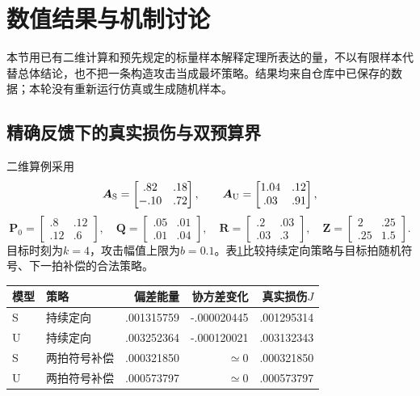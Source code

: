 \section{数值结果与机制讨论}
本节用已有二维计算和预先规定的标量样本解释定理所表达的量，不以有限样本代替总体结论，也不把一条构造攻击当成最坏策略。结果均来自仓库中已保存的数据；本轮没有重新运行仿真或生成随机样本。

\subsection{精确反馈下的真实损伤与双预算界}
二维算例采用
\[
{\bm{A}}_{\rm S}=\begin{bmatrix}.82&.18\\-.10&.72\end{bmatrix},\qquad
{\bm{A}}_{\rm U}=\begin{bmatrix}1.04&.12\\.03&.91\end{bmatrix},
\]
\[
{\bm{P}}_0=\begin{bmatrix}.8&.12\\.12&.6\end{bmatrix},\quad
{\bm{Q}}=\begin{bmatrix}.05&.01\\.01&.04\end{bmatrix},\quad
{\bm{R}}=\begin{bmatrix}.2&.03\\.03&.3\end{bmatrix},\quad
{\bm{Z}}=\begin{bmatrix}2&.25\\.25&1.5\end{bmatrix}.
\]
目标时刻为$k=4$，攻击幅值上限为$b=0.1$。表\ref{tab:damage-decomp}比较持续定向策略与目标拍随机符号、下一拍补偿的合法策略。

\begin{table}[ht]
\centering\footnotesize
{}
\label{tab:damage-decomp}
\begin{tabular}{llrrr}
\toprule
模型 & 策略 & 偏差能量 & 协方差变化 & 真实损伤$J$\\
\midrule
S & 持续定向 & .001315759 & -.000020445 & .001295314\\
U & 持续定向 & .003252364 & -.000120021 & .003132343\\
S & 两拍符号补偿 & .000321850 & $\simeq0$ & .000321850\\
U & 两拍符号补偿 & .000573797 & $\simeq0$ & .000573797\\
\bottomrule
\end{tabular}
\end{table}

